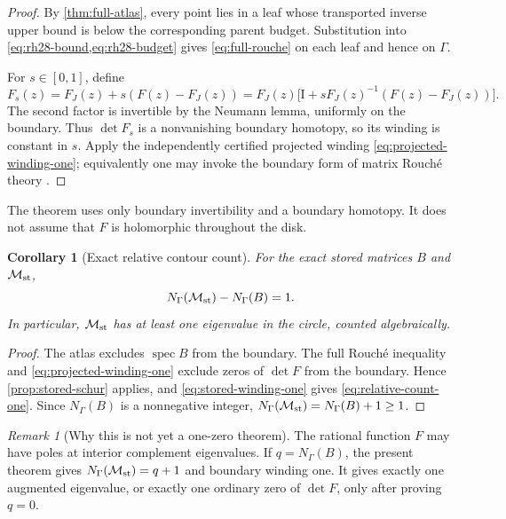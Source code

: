 \documentclass[11pt]{article}
\newtheorem{corollary}[theorem]{Corollary}
\theoremstyle{definition}
\theoremstyle{remark}
\newtheorem{remark}[theorem]{Remark}
\newcommand{\Id}{\mathrm I}
\newcommand{\spec}{\operatorname{spec}}
\newcommand{\Maug}{\mathcal M_{\rm st}}
\begin{document}
\begin{proof}
By \cref{thm:full-atlas}, every point lies in a leaf whose transported
inverse upper bound is below the corresponding parent budget.  Substitution
into \cref{eq:rh28-bound,eq:rh28-budget} gives \cref{eq:full-rouche} on each
leaf and hence on $\Gamma$.

For $s\in[0,1]$, define
\[
 F_s(z)=F_J(z)+s(F(z)-F_J(z))
 =F_J(z)\bigl[\Id+sF_J(z)^{-1}(F(z)-F_J(z))\bigr].
\]
The second factor is invertible by the Neumann lemma, uniformly on the
boundary.  Thus $\det F_s$ is a nonvanishing boundary homotopy, so its
winding is constant in $s$.  Apply the independently certified projected
winding \cref{eq:projected-winding-one}; equivalently one may invoke the
boundary form of matrix Rouch\'e theory \citep{GohbergSigal1971}.
\end{proof}

The theorem uses only boundary invertibility and a boundary homotopy.  It
does not assume that $F$ is holomorphic throughout the disk.

\begin{corollary}[Exact relative contour count]
\label{cor:relative-count}
For the exact stored matrices $B$ and $\Maug$,
\begin{equation}
 N_\Gamma(\Maug)-N_\Gamma(B)=1.
 \label{eq:relative-count-one}
\end{equation}
In particular, $\Maug$ has at least one eigenvalue in the circle, counted
algebraically.
\end{corollary}

\begin{proof}
The atlas excludes $\spec B$ from the boundary.  The full Rouch\'e
inequality and \cref{eq:projected-winding-one} exclude zeros of $\det F$
from the boundary.  Hence \cref{prop:stored-schur} applies, and
\cref{eq:stored-winding-one} gives \cref{eq:relative-count-one}.  Since
$N_\Gamma(B)$ is a nonnegative integer,
$N_\Gamma(\Maug)=N_\Gamma(B)+1\geq1$.
\end{proof}

\begin{remark}[Why this is not yet a one-zero theorem]
\label{rem:not-one-zero}
The rational function $F$ may have poles at interior complement
eigenvalues.  If $q=N_\Gamma(B)$, the present theorem gives
$N_\Gamma(\Maug)=q+1$ and boundary winding one.  It gives exactly one
augmented eigenvalue, or exactly one ordinary zero of $\det F$, only after
proving $q=0$.
\end{remark}
\end{document}

